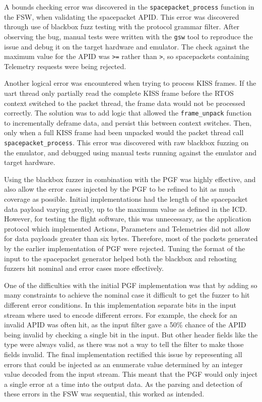 \documentclass[../report.tex]{subfiles}
\begin{document}
A bounds checking error was discovered in the \lstinline|spacepacket_process|
function in the FSW, when validating the spacepacket APID. This error was
discovered through use of blackbox fuzz testing with the protocol grammar
filter. After observing the bug, manual tests were written with the
\lstinline|gsw| tool to reproduce the issue and debug it on the target hardware
and emulator. The check against the maximum value for the APID was
\lstinline|>=| rather than \lstinline|>|, so spacepackets containing Telemetry
requests were being rejected.

Another logical error was encountered when trying to process KISS frames. If
the uart thread only partially read the complete KISS frame before the
RTOS context switched to the packet thread, the frame data would not be
processed correctly. The solution was to add logic that allowed the
\lstinline|frame_unpack| function to incrementally deframe data, and persist
this between context switches. Then, only when a full KISS frame had been
unpacked would the packet thread call \lstinline|spacepacket_process|. This
error was discovered with raw blackbox fuzzing on the emulator, and debugged
using manual tests running against the emulator and target hardware.



Using the blackbox fuzzer in combination with the PGF was highly effective, and
also allow the error cases injected by the PGF to be refined to hit as much
coverage as possible. Initial implementations had the length of the spacepacket
data payload varying greatly, up to the maximum value as defined in the ICD.
However, for testing the flight software, this was unnecessary, as the
application protocol which implemented Actions, Parameters and Telemetries did
not allow for data payloads greater than six bytes. Therefore, most of the
packets generated by the earlier implementation of PGF were rejected. Tuning
the format of the input to the spacepacket generator helped both the blackbox
and rehosting fuzzers hit nominal and error cases more effectively.

One of the difficulties with the initial PGF implementation was that by adding
so many constraints to achieve the nominal case it difficult to get the fuzzer
to hit different error conditions. In this implementation separate bits in the
input stream where used to encode different errors. For example, the check for
an invalid APID was often hit, as the input filter gave a 50\% chance of the
APID being invalid by checking a single bit in the input. But other header
fields like the type were always valid, as there was not a way to tell the
filter to make those fields invalid. The final implementation rectified this
issue by representing all errors that could be injected as an enumerate value
determined by an integer value decoded from the input stream. This meant that
the PGF would only inject a single error at a time into the output data. As the
parsing and detection of these errors in the FSW was sequential, this worked as
intended.
\end{document}

